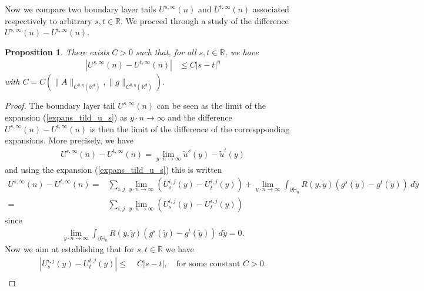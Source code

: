 \documentclass[11pt, reqno]{amsart}
\newtheorem{proposition}[theorem]{Proposition}
\theoremstyle{definition}
\theoremstyle{remark}
\numberwithin{equation}{section}
\begin{document}
	
	
	\noindent  Now we compare two boundary layer tails $U^{s,\infty}(n)$ and  $U^{t,\infty}(n)$ associated respectively to arbitrary  $s,t\in\mathbb{R}.$ We  proceed through a study of the difference $U^{s,\infty}(n) -U^{t,\infty}(n)$.
	
	\begin{proposition}
		There exists $C>0$ such that, for all $s,t\in\mathbb{R}$,	we have 
		\begin{align*}
			|U^{s,\infty}(n) -U^{t,\infty}(n)| &\leq C |s-t|^{\eta}
		\end{align*}
			with  $C=C\left(\|A\|_{C^{0,\eta}(\mathbb{R}^d)},   \|g\|_{C^{0,\eta}(\mathbb{R}^d)}\right).$
	\end{proposition}
	\begin{proof}[Proof]
		
		The boundary layer tail $U^{s,\infty}(n)$  can be seen as the limit of the expansion (\ref{expans_tild_u_s}) as  $y\cdot n\rightarrow \infty$ and the difference  $U^{s,\infty}(n) -U^{t,\infty}(n)$ is then the limit of the difference of the correspponding expansions. More precisely, we have 
		\begin{align*}
			U^{s,\infty}(n) -U^{t,\infty}(n)= 	\lim_{y\cdot n \rightarrow \infty}	\tilde{u}^s(y)-\tilde{u}^t(y)
		\end{align*}
		and using the expansion (\ref{expans_tild_u_s}) this is written
		\begin{align*}
			U^{s,\infty}(n) -U^{t,\infty}(n)= &	\sum_{i,j} \lim_{y\cdot n \rightarrow \infty}  (U_s^{i,j}(y) -U_t^{i,j}(y)) +   \lim_{y\cdot n \rightarrow \infty} \int_{\partial\mathbb{H}_n} R(y,\tilde{y})(g^s(\tilde{y})-g^t(\tilde{y}))\ d\tilde{y}\\
			=&	\sum_{i,j} \lim_{y\cdot n \rightarrow \infty}  (U_s^{i,j}(y) -U_t^{i,j}(y)) 
		\end{align*}
		since
		\begin{align*}
			\lim_{y\cdot n \rightarrow \infty} \int_{\partial\mathbb{H}_n} R(y,\tilde{y})(g^s(\tilde{y})-g^t(\tilde{y}))\ d\tilde{y}=0.
		\end{align*}
		Now we aim at establishing that for $s,t\in\mathbb{R}$ we have 
		\begin{align*}
			|	U^{i,j}_{s}(y)- 	U^{i,j}_{t}(y) |
			\leq &\; C |s-t|, \quad \mbox{for some constant } C>0. \\
		\end{align*}
		

\end{proof}
\end{document}
